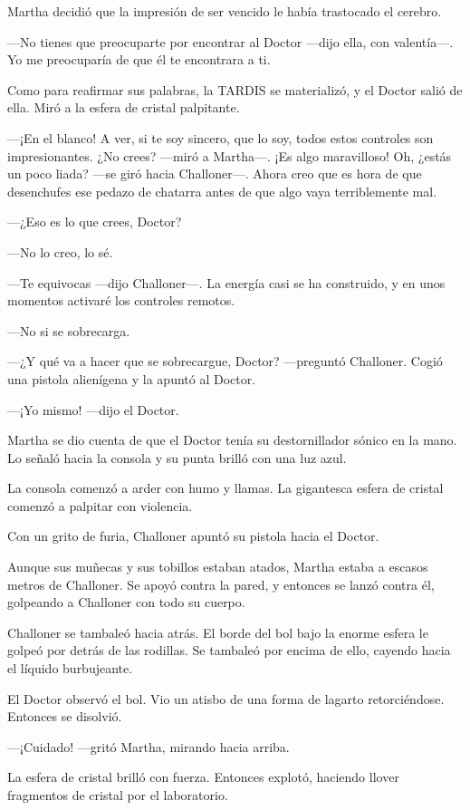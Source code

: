 Martha decidió que la impresión de ser vencido le había trastocado el
cerebro.

---No tienes que preocuparte por encontrar al Doctor ---dijo ella, con
valentía---. Yo me preocuparía de que él te encontrara a ti.

Como para reafirmar sus palabras, la TARDIS se materializó, y el Doctor
salió de ella. Miró a la esfera de cristal palpitante.

---¡En el blanco! A ver, si te soy sincero, que lo soy, todos estos
controles son impresionantes. ¿No crees? ---miró a Martha---. ¡Es algo
maravilloso! Oh, ¿estás un poco liada? ---se giró hacia Challoner---.
Ahora creo que es hora de que desenchufes ese pedazo de chatarra antes
de que algo vaya terriblemente mal.

---¿Eso es lo que crees, Doctor?

---No lo creo, lo sé.

---Te equivocas ---dijo Challoner---. La energía casi se ha construido,
y en unos momentos activaré los controles remotos.

---No si se sobrecarga.

---¿Y qué va a hacer que se sobrecargue, Doctor? ---preguntó Challoner.
Cogió una pistola alienígena y la apuntó al Doctor.

---¡Yo mismo! ---dijo el Doctor.

Martha se dio cuenta de que el Doctor tenía su destornillador sónico en
la mano. Lo señaló hacia la consola y su punta brilló con una luz azul.

La consola comenzó a arder con humo y llamas. La gigantesca esfera de
cristal comenzó a palpitar con violencia.

Con un grito de furia, Challoner apuntó su pistola hacia el Doctor.

Aunque sus muñecas y sus tobillos estaban atados, Martha estaba a
escasos metros de Challoner. Se apoyó contra la pared, y entonces se
lanzó contra él, golpeando a Challoner con todo su cuerpo.

Challoner se tambaleó hacia atrás. El borde del bol bajo la enorme
esfera le golpeó por detrás de las rodillas. Se tambaleó por encima de
ello, cayendo hacia el líquido burbujeante.

El Doctor observó el bol. Vio un atisbo de una forma de lagarto
retorciéndose. Entonces se disolvió.

---¡Cuidado! ---gritó Martha, mirando hacia arriba.

La esfera de cristal brilló con fuerza. Entonces explotó, haciendo
llover fragmentos de cristal por el laboratorio.

